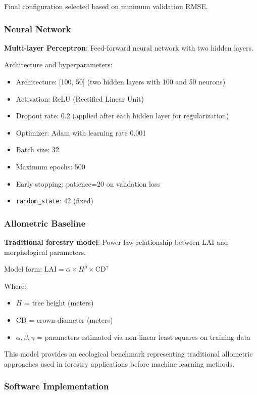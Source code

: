 \documentclass[11pt]{article}
\begin{document}
Final configuration selected based on minimum validation RMSE.

\subsubsection*{Neural Network}

\textbf{Multi-layer Perceptron}: Feed-forward neural network with two hidden layers.

Architecture and hyperparameters:
\begin{itemize}
    \item Architecture: [100, 50] (two hidden layers with 100 and 50 neurons)
    \item Activation: ReLU (Rectified Linear Unit)
    \item Dropout rate: 0.2 (applied after each hidden layer for regularization)
    \item Optimizer: Adam with learning rate 0.001
    \item Batch size: 32
    \item Maximum epochs: 500
    \item Early stopping: patience=20 on validation loss
    \item \texttt{random\_state}: 42 (fixed)
\end{itemize}

\subsubsection*{Allometric Baseline}

\textbf{Traditional forestry model}: Power law relationship between LAI and morphological parameters.

Model form: $\text{LAI} = \alpha \times H^\beta \times \text{CD}^\gamma$

Where:
\begin{itemize}
    \item $H$ = tree height (meters)
    \item $\text{CD}$ = crown diameter (meters)
    \item $\alpha, \beta, \gamma$ = parameters estimated via non-linear least squares on training data
\end{itemize}

This model provides an ecological benchmark representing traditional allometric approaches used in forestry applications before machine learning methods.

\subsubsection*{Software Implementation}
\end{document}
